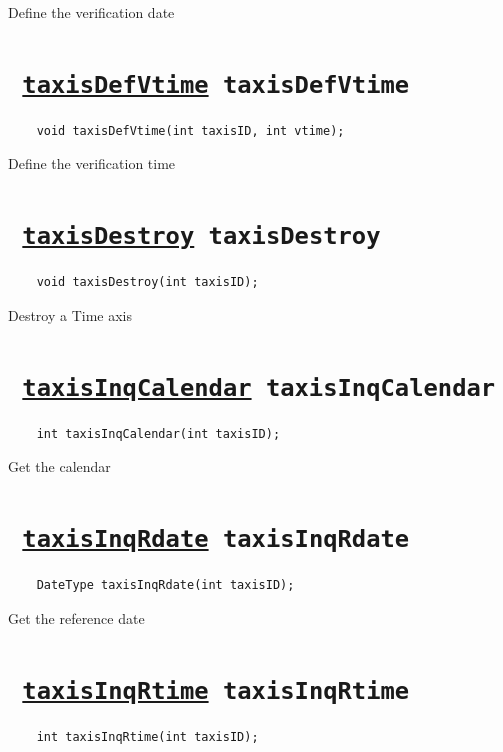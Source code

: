 Define the verification date
\ifpdfoutput{}{(\ref{taxisDefVdate})}


\section*{\texttt{ 
\ifpdf
\hyperref[taxisDefVtime]{taxisDefVtime}
\else
taxisDefVtime
\fi
}}
\begin{verbatim}
    void taxisDefVtime(int taxisID, int vtime);
\end{verbatim}

Define the verification time
\ifpdfoutput{}{(\ref{taxisDefVtime})}


\section*{\texttt{ 
\ifpdf
\hyperref[taxisDestroy]{taxisDestroy}
\else
taxisDestroy
\fi
}}
\begin{verbatim}
    void taxisDestroy(int taxisID);
\end{verbatim}

Destroy a Time axis
\ifpdfoutput{}{(\ref{taxisDestroy})}


\section*{\texttt{ 
\ifpdf
\hyperref[taxisInqCalendar]{taxisInqCalendar}
\else
taxisInqCalendar
\fi
}}
\begin{verbatim}
    int taxisInqCalendar(int taxisID);
\end{verbatim}

Get the calendar
\ifpdfoutput{}{(\ref{taxisInqCalendar})}


\section*{\texttt{ 
\ifpdf
\hyperref[taxisInqRdate]{taxisInqRdate}
\else
taxisInqRdate
\fi
}}
\begin{verbatim}
    DateType taxisInqRdate(int taxisID);
\end{verbatim}

Get the reference date
\ifpdfoutput{}{(\ref{taxisInqRdate})}


\section*{\texttt{ 
\ifpdf
\hyperref[taxisInqRtime]{taxisInqRtime}
\else
taxisInqRtime
\fi
}}
\begin{verbatim}
    int taxisInqRtime(int taxisID);
\end{verbatim}

